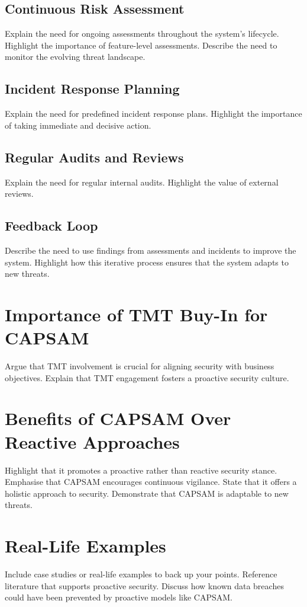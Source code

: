 \subsection{Continuous Risk Assessment}
Explain the need for ongoing assessments throughout the system's lifecycle. Highlight the importance of feature-level assessments. Describe the need to monitor the evolving threat landscape.
\subsection{Incident Response Planning}
Explain the need for predefined incident response plans. Highlight the importance of taking immediate and decisive action.
\subsection{Regular Audits and Reviews}
Explain the need for regular internal audits. Highlight the value of external reviews.
\subsection{Feedback Loop}
Describe the need to use findings from assessments and incidents to improve the system. Highlight how this iterative process ensures that the system adapts to new threats.

\section{Importance of TMT Buy-In for CAPSAM}
Argue that TMT involvement is crucial for aligning security with business objectives. Explain that TMT engagement fosters a proactive security culture.

\section{Benefits of CAPSAM Over Reactive Approaches}
Highlight that it promotes a proactive rather than reactive security stance. Emphasise that CAPSAM encourages continuous vigilance. State that it offers a holistic approach to security. Demonstrate that CAPSAM is adaptable to new threats.

\section{Real-Life Examples}
Include case studies or real-life examples to back up your points. Reference literature that supports proactive security. Discuss how known data breaches could have been prevented by proactive models like CAPSAM.

